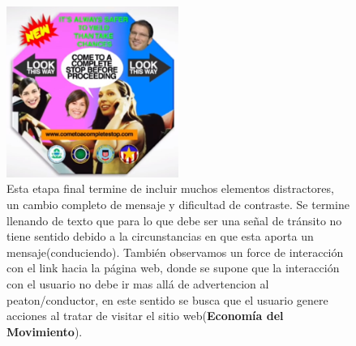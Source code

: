 \documentclass[a4paper,12pt]{article}
\begin{document}
\begin{figure}
\caption{Esta etapa final termine de incluir muchos elementos distractores, un cambio completo de mensaje y dificultad de contraste. Se termine llenando de texto que para lo que debe ser una señal de tránsito no tiene sentido debido a la circunstancias en que esta aporta un mensaje(conduciendo). También observamos un force de interacción con el link hacia la página web, donde se supone que la interacción con el usuario no debe ir mas allá de advertencion al peaton/conductor, en este sentido se busca que el usuario genere acciones al tratar de visitar el sitio web(\textbf{Economía del Movimiento}).}
\includegraphics[width=0.5\textwidth]{logop5}
\end{figure}
\end{document}

